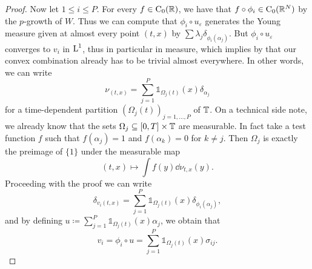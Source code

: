 \begin{proof}
 	Now let $ 1 \leq i \leq P $. For every $ f \in \operatorname{C}_{ 0 } ( \mathbb{ R } ) 
 	$, we have that $ f \circ \phi_{ i } \in \operatorname{C}_{ 0 } ( \mathbb{ R }^{ N } ) 
 	$ by the $p$-growth of $ W $. Thus we can compute that $ \phi_{ i } \circ 
 	u_{ \varepsilon } $ generates the Young measure given at almost every point 
 	$ ( t, x ) $ by $ \sum \lambda_{ j } \delta_{ \phi_{ i 
 	} ( \alpha_{ j } ) } $.
 	But $ \phi_{ i } \circ u_{ \varepsilon } $ converges to $ v_{ i } $ in $ 
 	\operatorname{L}^{ 1 } $, thus in particular in measure, which implies by 
 	\cite[Cor.~3.2]{Müller1999} that our convex combination already has to be 
 	trivial almost everywhere. In other words, we can write 
 	\begin{equation*}
 		\nu_{ ( t , x ) }
 		=
 		\sum_{ j= 1 }^{ P }
 			\mathds{ 1 }_{ \Omega_{ j } ( t ) } ( x )
 			\delta_{ \alpha_{ j } }
 	\end{equation*}
 	for a time-dependent partition $ ( \Omega_{ j } ( t ) )_{ j = 1 , \dotsc , 
 	P } $ of $ \operatorname{\mathbb{T}} $. On a technical side note, we already know that the 
 	sets $ \Omega_{ j } \subseteq [ 0 , T ] \times \operatorname{\mathbb{T}} $ are measurable.
 	In fact take a test function $ f $ such that $ f ( \alpha_{ j } ) = 1 $ and 
 	$ f ( 
 	\alpha_{ k } ) = 0 $ for $ k \neq j $. Then $ \Omega_{ j } $ is exactly the 
 	preimage of $ \{ 1 \} $ under the measurable map 
 	\begin{equation*}
 		( t , x ) \mapsto \int f ( y ) \dd{ \nu_{ t , x } ( y ) }.
 	\end{equation*} 
 	Proceeding with the proof we can write 
 	\begin{equation*}
 		\delta_{ v_{ i } ( t , x ) }
 		=
 		\sum_{ j = 1 }^{ P }
 			\mathds{ 1 }_{ \Omega_{ j } ( t ) } ( x )
 			\delta_{ \phi_{ i } ( \alpha_{ j } ) },
 	\end{equation*}
 	and by defining 
 	$ u \coloneqq \sum_{ j = 1 }^{ P } \mathds{ 1 }_{ \Omega_{ j } ( t ) } ( x ) \alpha_{ j } $, 
 	we obtain that 
 	\begin{equation*} 
 		v_{ i } = 
 		\phi_{ i } \circ u  = \sum_{ j = 1 }^{ P } \mathds{ 1 }_{ \Omega_{ j } 
 		( t ) } ( x ) \sigma_{ i j } .
 	\end{equation*}
 

\end{proof}
